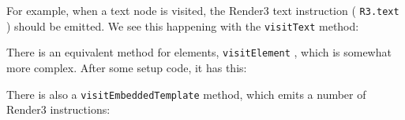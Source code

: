 

For example, when a text node is visited, the Render3 text instruction (
\texttt{R3.text}
)
should be emitted. We see this happening with the
\texttt{visitText}
method:



There is an equivalent method for elements,
\texttt{visitElement}
, which is somewhat more
complex. After some setup code, it has this:



There is also a
\texttt{visitEmbeddedTemplate}
method, which emits a number of Render3
instructions:


